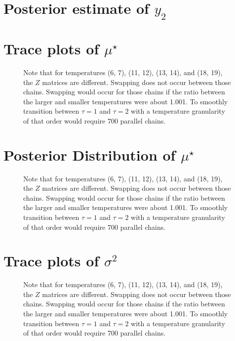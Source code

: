 \documentclass[10pt]{article} %
\begin{document}
\newpage
\section{Posterior estimate of $y_2$}
\begin{figure}[H]
  \begin{center}  %
  \end{center}
  \label{fig:yzest}
\end{figure}


\newpage
\section{Trace plots of $\mu^\star$}
\begin{figure}[H]
  \begin{center}  %
  \end{center}
  \label{fig:mustrace}
  \caption{Note that for temperatures (6, 7), (11, 12), (13, 14), and (18, 19),
  the $Z$ matrices are different. Swapping does not occur between those chains.
  Swapping would occur for those chains if the ratio between the larger and smaller
  temperatures were about 1.001. To smoothly transition between $\tau=1$ and
  $\tau=2$ with a temperature granularity of that order would require 700 parallel
  chains.}
\end{figure}

\newpage
\section{Posterior Distribution of $\mu^\star$}
\begin{figure}[H]
  \begin{center}  %
  \end{center}
  \label{fig:mus}
  \caption{Note that for temperatures (6, 7), (11, 12), (13, 14), and (18, 19),
  the $Z$ matrices are different. Swapping does not occur between those chains.
  Swapping would occur for those chains if the ratio between the larger and smaller
  temperatures were about 1.001. To smoothly transition between $\tau=1$ and
  $\tau=2$ with a temperature granularity of that order would require 700 parallel
  chains.}
\end{figure}

\newpage
\section{Trace plots of $\sigma^2$}
\begin{figure}[H]
  \begin{center}  %
  \end{center}
  \label{fig:sig2trace}
  \caption{Note that for temperatures (6, 7), (11, 12), (13, 14), and (18, 19),
  the $Z$ matrices are different. Swapping does not occur between those chains.
  Swapping would occur for those chains if the ratio between the larger and smaller
  temperatures were about 1.001. To smoothly transition between $\tau=1$ and
  $\tau=2$ with a temperature granularity of that order would require 700 parallel
  chains.}
\end{figure}
\end{document}
